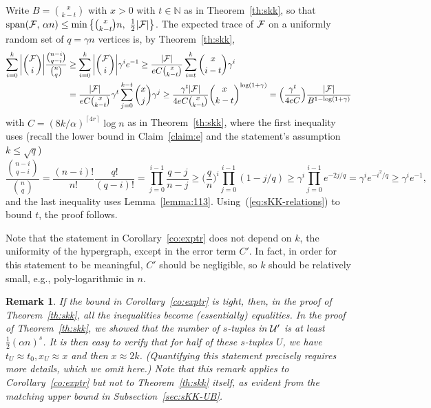 \documentclass[11pt]{article}
\makeatletter
\renewenvironment{proof}[1][\proofname]
{\par\pushQED{\qed}
	\normalfont\topsep6\p@\@plus6\p@\relax\trivlist
	\item[\hskip\labelsep\bfseries#1\@addpunct{.}]
	\ignorespaces}
{\popQED\endtrivlist\@endpefalse}
\newtheorem{remark}[theo]{Remark}
\newcommand{\FF}{{\cal F}}
\newcommand{\UU}{{\cal U}}
\newcommand{\ceil}[1]{\left\lceil #1 \right\rceil}
\renewcommand{\wp}{\mathrm{span}}
\renewcommand{\a}{\alpha}
\newcommand{\g}{\gamma}
\newcommand{\N}{\mathbb{N}}
\makeatother
\begin{document}
	\begin {proof}
	Write $B = \binom{x}{k-t}$ with $x>0$ with $t \in \N$ as in Theorem~\ref{th:skk}, so that 
	$\wp(\FF,\,\a n) \le \min\big\{\binom{x}{k-t}n,\,\, \frac{1}{2}|\FF|\big\}$.
	The expected trace of $\FF$ on a uniformly random set of $q = \g n$ vertices is, by Theorem~\ref{th:skk},
	\begin{align*}
	\sum_{i=0}^k \bigg| \binom{\FF}{i}\bigg| \frac{\binom{n-i}{q-i}}{\binom{n}{q}} &\ge \sum_{i=0}^k \bigg| \binom{\FF}{i}\bigg| \g^i e^{-1}
	\ge \frac{|\FF|}{eC\binom{x}{k-t}}\sum_{i=t}^k \binom{x}{i-t} \g^i \\
	&= \frac{|\FF|}{eC\binom{x}{k-t}}\g^t\sum_{j=0}^{k-t} \binom{x}{j} \g^{j} 
	\ge \frac{\g^t |\FF|}{4eC\binom{x}{k-t}}\binom{x}{k-t}^{\log(1+\g)}
	= \Big(\frac{\g^t}{4eC}\Big)\frac{|\FF|}{B^{1-\log(1+\g)}}
	\end{align*} 
	with $C= (8k/\a)^{\ceil{4r}}\log n$ as in Theorem~\ref{th:skk},
	where the first inequality uses (recall the lower bound in Claim~\ref{claim:e} and the statement's assumption $k \le \sqrt{q}$)
	$$\frac{\binom{n-i}{q-i}}{\binom{n}{q}} = \frac{(n-i)!}{n!}\frac{q!}{(q-i)!} = \prod_{j=0}^{i-1} \frac{q-j}{n-j}
	\ge \Big(\frac{q}{n}\Big)^i \prod_{j=0}^{i-1} (1-j/q)
	\ge \g^i \prod_{j=0}^{i-1} e^{-2j/q} = \g^i e^{-i^2/q} \ge \g^i e^{-1},$$
	and the last inequality uses Lemma~\ref{lemma:113}. 
	Using~(\ref{eq:sKK-relations}) to bound $t$, the proof follows.
	\end {proof}
	
	Note that the statement in Corollary~\ref{co:exptr} does not depend on $k$, the uniformity of the hypergraph, except in the error term $C'$. In fact, in order for this statement to be meaningful, $C'$ should be negligible, so $k$ should be relatively small, e.g., poly-logarithmic in $n$.
	
	\begin{remark}
	If the bound in Corollary~\ref{co:exptr} is tight, then, in the proof of Theorem~\ref{th:skk}, all the inequalities become (essentially) equalities. In the proof of Theorem~\ref{th:skk}, we showed that the number of $s$-tuples in $\UU'$ is at least $\frac12(\a n)^s$.
	It is then easy to verify that for half of these $s$-tuples $U$, we have $t_U \approx t_0, x_U \approx x$ and then $x \approx 2k$. (Quantifying this statement precisely requires more details, which we omit here.)
	Note that this remark applies to Corollary~\ref{co:exptr} but not to Theorem~\ref{th:skk} itself, as evident from the matching upper bound in Subsection~\ref{sec:sKK-UB}.
	\end{remark}
	
\end{document}
